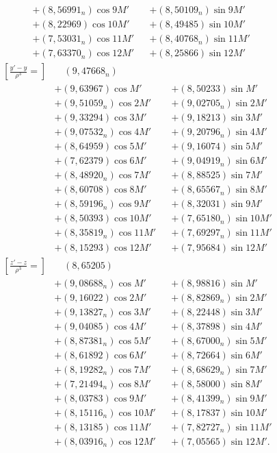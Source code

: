 \[
\begin{aligned}
&+(8{,}56991_n)\cos9M'    &&+(8{,}50109_n)\sin9M'\\
&+(8{,}22969)\cos10M'     &&+(8{,}49485)\sin10M'\\
&+(7{,}53031_n)\cos11M'   &&+(8{,}40768_n)\sin11M'\\
&+(7{,}63370_n)\cos12M'   &&+(8{,}25866)\sin12M'
\end{aligned}
\]
\[
\begin{aligned}
{\left[\frac{y'-y}{\rho^3}=\right]}&\quad(9{,}47668_n)\\
&+(9{,}63967)\cos M'       &&+(8{,}50233)\sin M'\\
&+(9{,}51059_n)\cos2M'    &&+(9{,}02705_n)\sin2M'\\
&+(9{,}33294)\cos3M'      &&+(9{,}18213)\sin3M'\\
&+(9{,}07532_n)\cos4M'    &&+(9{,}20796_n)\sin4M'\\
&+(8{,}64959)\cos5M'      &&+(9{,}16074)\sin5M'\\
&+(7{,}62379)\cos6M'      &&+(9{,}04919_n)\sin6M'\\
&+(8{,}48920_n)\cos7M'    &&+(8{,}88525)\sin7M'\\
&+(8{,}60708)\cos8M'      &&+(8{,}65567_n)\sin8M'\\
&+(8{,}59196_n)\cos9M'    &&+(8{,}32031)\sin9M'\\
&+(8{,}50393)\cos10M'     &&+(7{,}65180_n)\sin10M'\\
&+(8{,}35819_n)\cos11M'   &&+(7{,}69297_n)\sin11M'\\
&+(8{,}15293)\cos12M'     &&+(7{,}95684)\sin12M'
\end{aligned}
\]
\[
\begin{aligned}
{\left[\frac{z'-z}{\rho^3}=\right]}&\quad(8{,}65205)\\
&+(9{,}08688_n)\cos M'    &&+(8{,}98816)\sin M'\\
&+(9{,}16022)\cos2M'      &&+(8{,}82869_n)\sin2M'\\
&+(9{,}13827_n)\cos3M'    &&+(8{,}22448)\sin3M'\\
&+(9{,}04085)\cos4M'      &&+(8{,}37898)\sin4M'\\
&+(8{,}87381_n)\cos5M'    &&+(8{,}67000_n)\sin5M'\\
&+(8{,}61892)\cos6M'      &&+(8{,}72664)\sin6M'\\
&+(8{,}19282_n)\cos7M'    &&+(8{,}68629_n)\sin7M'\\
&+(7{,}21494_n)\cos8M'    &&+(8{,}58000)\sin8M'\\
&+(8{,}03783)\cos9M'      &&+(8{,}41399_n)\sin9M'\\
&+(8{,}15116_n)\cos10M'   &&+(8{,}17837)\sin10M'\\
&+(8{,}13185)\cos11M'     &&+(7{,}82727_n)\sin11M'\\
&+(8{,}03916_n)\cos12M'   &&+(7{,}05565)\sin12M'.
\end{aligned}
\]
\endgroup

\clearpage
\endgroup
